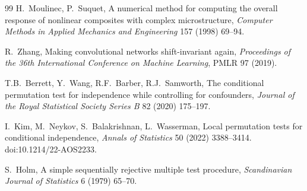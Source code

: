 \documentclass[preprint,11pt,a4paper]{elsarticle}
\begin{document}
\begin{thebibliography}{99}
H.~Moulinec, P.~Suquet,
\newblock A numerical method for computing the overall response of nonlinear
composites with complex microstructure,
\newblock \emph{Computer Methods in Applied Mechanics and Engineering} 157 (1998)
69--94.

R.~Zhang,
\newblock Making convolutional networks shift-invariant again,
\newblock \emph{Proceedings of the 36th International Conference on Machine Learning},
PMLR 97 (2019).

T.B.~Berrett, Y.~Wang, R.F.~Barber, R.J.~Samworth,
\newblock The conditional permutation test for independence while controlling for
confounders,
\newblock \emph{Journal of the Royal Statistical Society Series B} 82 (2020) 175--197.

I.~Kim, M.~Neykov, S.~Balakrishnan, L.~Wasserman,
\newblock Local permutation tests for conditional independence,
\newblock \emph{Annals of Statistics} 50 (2022) 3388--3414.
\newblock doi:10.1214/22-AOS2233.

S.~Holm,
\newblock A simple sequentially rejective multiple test procedure,
\newblock \emph{Scandinavian Journal of Statistics} 6 (1979) 65--70.

\end{thebibliography}
\end{document}
